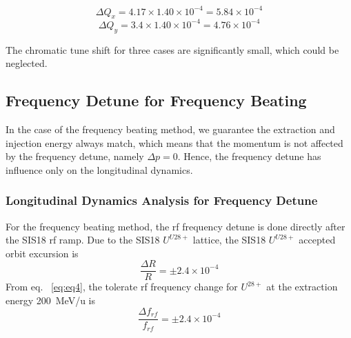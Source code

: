 \begin{equation}
\Delta Q_x = 4.17\times 1.40\times 10^{-4}=5.84 \times 10^{-4}
\end{equation}
\begin{equation}
\Delta Q_y = 3.4\times 1.40\times 10^{-4}=4.76\times 10^{-4} 
\end{equation}


The chromatic tune shift for three cases are significantly small, which could be neglected.
\subsection{Frequency Detune for Frequency Beating}
In the case of the frequency beating method, we guarantee the extraction and injection energy always match, which means that the momentum is not affected by the frequency detune, namely $\Delta p = 0$. Hence, the frequency detune has influence only on the longitudinal dynamics.

\subsubsection{Longitudinal Dynamics Analysis for Frequency Detune}
For the frequency beating method, the rf frequency detune is done directly after the SIS18 rf ramp. Due to the SIS18 $U^\mathit{U28+}$ lattice, the SIS18 $U^\mathit{U28+}$ accepted orbit excursion is~\cite{liebermann_fair_2013}
\begin{equation}
\frac{\Delta{R}}{R} = \pm 2.4 \times 10^{-4}
\end{equation}
From eq. ~\ref{eq:eq4}, the tolerate rf frequency change for $U^{28+}$ at the extraction energy \SI{200}{MeV/u} is
\begin{equation}
\frac{\Delta{f}_\mathit{rf}}{f_\mathit{rf}} = \pm 2.4 \times 10^{-4}
\end{equation}


